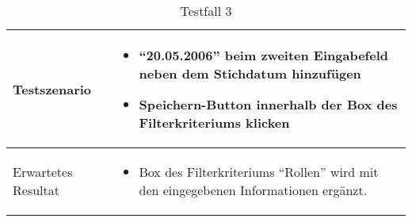 \newpage

\begin{table}[h!]
   \begin{tabular}{|L{0.4\textwidth}|L{0.6\textwidth}|}
      \hline
       Testszenario & 
       \begin{itemize}
         \item ``20.05.2006'' beim zweiten Eingabefeld neben dem Stichdatum hinzufügen
         \item Speichern-Button innerhalb der Box des Filterkriteriums klicken
       \end{itemize} \\
       \hline
       Erwartetes Resultat & 
       \begin{itemize}
         \item Box des Filterkriteriums ``Rollen'' wird mit den eingegebenen Informationen ergänzt.
      \end{itemize} \\
      \hline
     \end{tabular}
     \caption{Testfall 3}
\end{table}

\newpage

